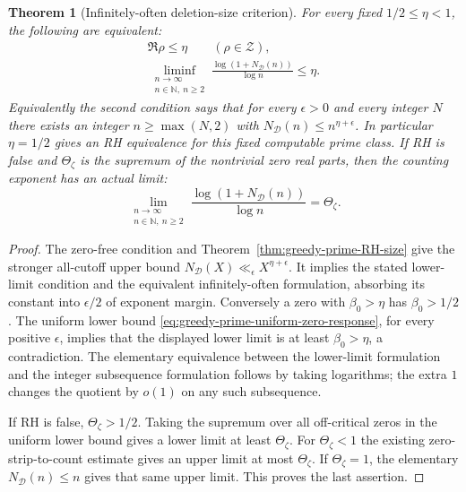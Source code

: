 \documentclass[11pt]{article}
\newtheorem{theorem}{Theorem}[section]
\theoremstyle{definition}
\begin{document}
\begin{theorem}[Infinitely-often deletion-size criterion]
\label{thm:greedy-prime-liminf-RH}
For every fixed $1/2\le\eta<1$, the following are equivalent:
\begin{equation}
 \begin{gathered}
 \Re\rho\le\eta\qquad(\rho\in\mathcal Z),\\
 \liminf_{\substack{n\to\infty\\n\in\mathbb N,\ n\ge2}}
       \frac{\log(1+N_{\mathcal D}(n))}{\log n}\le\eta .
 \end{gathered}
 \label{eq:greedy-prime-liminf-RH}
\end{equation}
Equivalently the second condition says that for every $\epsilon>0$
and every integer $N$ there exists an integer $n\ge\max(N,2)$ with
$N_{\mathcal D}(n)\le n^{\eta+\epsilon}$.
In particular $\eta=1/2$ gives an RH equivalence for this fixed
computable prime class.
If RH is false and $\Theta_\zeta$ is the supremum of the nontrivial
zero real parts, then the counting exponent has an actual limit:
\[
 \lim_{\substack{n\to\infty\\n\in\mathbb N,\ n\ge2}}
       \frac{\log(1+N_{\mathcal D}(n))}{\log n}
                                      =\Theta_\zeta .
\]
\end{theorem}

\begin{proof}
The zero-free condition and
Theorem~\ref{thm:greedy-prime-RH-size} give the stronger all-cutoff
upper bound $N_{\mathcal D}(X)\ll_\epsilon X^{\eta+\epsilon}$.
It implies the stated lower-limit condition and the equivalent
infinitely-often formulation, absorbing its constant into
$\epsilon/2$ of exponent margin.
Conversely a zero with $\beta_0>\eta$ has $\beta_0>1/2$.
The uniform lower bound
\eqref{eq:greedy-prime-uniform-zero-response}, for every positive
$\epsilon$, implies that the displayed lower limit is at least
$\beta_0>\eta$, a contradiction.
The elementary equivalence between the lower-limit formulation and
the integer subsequence formulation follows by taking logarithms;
the extra $1$ changes the quotient by $o(1)$ on any such subsequence.

If RH is false, $\Theta_\zeta>1/2$.
Taking the supremum over all off-critical zeros in the uniform lower
bound gives a lower limit at least $\Theta_\zeta$.
For $\Theta_\zeta<1$ the existing zero-strip-to-count estimate gives
an upper limit at most $\Theta_\zeta$.
If $\Theta_\zeta=1$, the elementary $N_{\mathcal D}(n)\le n$
gives that same upper limit.
This proves the last assertion.
\end{proof}
\end{document}
